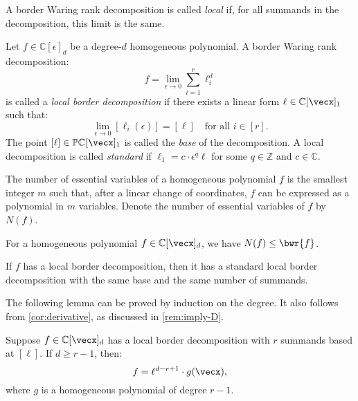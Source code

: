 \documentclass{article}
\begin{document}
 


A border Waring rank decomposition is called \emph{local} if, for all summands in the decomposition, this limit is the same. 


\begin{definition}
    Let \( f \in \mathbb{C}[\epsilon]_d \) be a degree-\( d \) homogeneous polynomial. A border Waring rank decomposition:
    \[
    f = \lim_{\epsilon \to 0} \sum_{i=1}^{r} \ell_i^d
    \]
    is called a \emph{local border decomposition} if there exists a linear form \( \ell \in \mathbb{C}[\vecx]_1 \) such that:
    \[
    \lim_{\epsilon \to 0} [\ell_i(\epsilon)] = [\ell] \quad \text{for all } i \in [r].
    \]
    The point \( [\ell] \in \mathbb{P}\mathbb{C}[\vecx]_1 \) is called the \emph{base} of the decomposition. 
    A local decomposition is called \emph{standard} if \( \ell_1 = c \cdot \epsilon^q \ell \) for some \( q \in \mathbb{Z} \) and \( c \in \mathbb{C} \). 
\end{definition}

The number of essential variables of a homogeneous polynomial \( f \) is the smallest integer \( m \) such that, after a linear change of coordinates, \( f \) can be expressed as a polynomial in \( m \) variables. Denote the number of essential variables of \( f \) by \( N(f) \).


\begin{lemma}
\label{lem:ess-var}
    For a homogeneous polynomial \( f \in \mathbb{C}[\vecx]_d \), we have \( N(f) \leq \bwr{f} \).
\end{lemma}

\begin{lemma}\label{lem:D:standard}
    If \( f \) has a local border decomposition, then it has a standard local border decomposition with the same base and the same number of summands. 
\end{lemma}

The following lemma can be proved by induction on the degree. It also follows from \autoref{cor:derivative}, as discussed in \autoref{rem:imply-D}.


\begin{lemma}\label{lem:D:divide}
    Suppose \( f \in \mathbb{C}[\vecx]_d \) has a local border decomposition with \( r \) summands based at \( [\ell] \). If \( d \geq r - 1 \), then:
    \[
    f = \ell^{d-r+1} \cdot g(\vecx),
    \]
    where \( g \) is a homogeneous polynomial of degree \( r - 1 \). 
\end{lemma}
\end{document}
